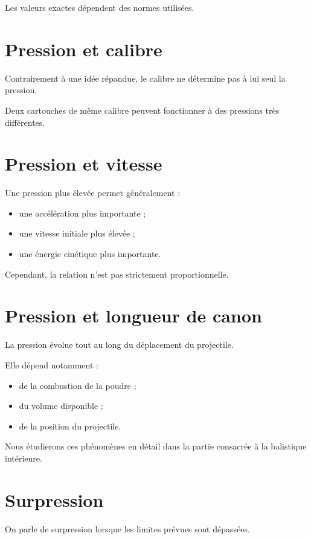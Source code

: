 Les valeurs exactes dépendent des normes utilisées.

\section{Pression et calibre}

Contrairement à une idée répandue, le calibre ne détermine pas à lui seul la
pression.

Deux cartouches de même calibre peuvent fonctionner à des pressions très
différentes.

\section{Pression et vitesse}

Une pression plus élevée permet généralement :

\begin{itemize}
    \item une accélération plus importante ;
    \item une vitesse initiale plus élevée ;
    \item une énergie cinétique plus importante.
\end{itemize}

Cependant, la relation n'est pas strictement proportionnelle.

\section{Pression et longueur de canon}

La pression évolue tout au long du déplacement du projectile.

Elle dépend notamment :

\begin{itemize}
    \item de la combustion de la poudre ;
    \item du volume disponible ;
    \item de la position du projectile.
\end{itemize}

Nous étudierons ces phénomènes en détail dans la partie consacrée à la
balistique intérieure.

\section{Surpression}

On parle de surpression lorsque les limites prévues sont dépassées.

